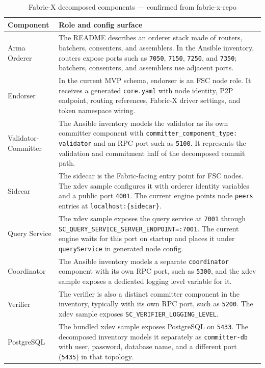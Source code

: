 \begin{table}[h]
\centering
\begin{tabularx}{\textwidth}{|l|X|}
\hline
\textbf{Component} & \textbf{Role and config surface} \\
\hline
Arma Orderer & The README describes an orderer stack made of routers, batchers, consenters, and assemblers. In the Ansible inventory, routers expose ports such as \texttt{7050}, \texttt{7150}, \texttt{7250}, and \texttt{7350}; batchers, consenters, and assemblers use adjacent ports. \\
\hline
Endorser & In the current MVP schema, endorser is an FSC node role. It receives a generated \texttt{core.yaml} with node identity, P2P endpoint, routing references, Fabric-X driver settings, and token namespace wiring. \\
\hline
Validator-Committer & The Ansible inventory models the validator as its own committer component with \texttt{committer\_component\_type: validator} and an RPC port such as \texttt{5100}. It represents the validation and commitment half of the decomposed commit path. \\
\hline
Sidecar & The sidecar is the Fabric-facing entry point for FSC nodes. The xdev sample configures it with orderer identity variables and a public port \texttt{4001}. The current engine points node \texttt{peers} entries at \texttt{localhost:\{sidecar\}}. \\
\hline
Query Service & The xdev sample exposes the query service at \texttt{7001} through \texttt{SC\_QUERY\_SERVICE\_SERVER\_ENDPOINT=:7001}. The current engine waits for this port on startup and places it under \texttt{queryService} in generated node config. \\
\hline
Coordinator & The Ansible inventory models a separate \texttt{coordinator} component with its own RPC port, such as \texttt{5300}, and the xdev sample exposes a dedicated logging level variable for it. \\
\hline
Verifier & The verifier is also a distinct committer component in the inventory, typically with its own RPC port, such as \texttt{5200}. The xdev sample exposes \texttt{SC\_VERIFIER\_LOGGING\_LEVEL}. \\
\hline
PostgreSQL & The bundled xdev sample exposes PostgreSQL on \texttt{5433}. The decomposed inventory models it separately as \texttt{committer-db} with user, password, database name, and a different port (\texttt{5435}) in that topology. \\
\hline
\end{tabularx}
\caption{Fabric-X decomposed components --- confirmed from fabric-x-repo}
\label{tab:fabricx-components}
\end{table}

